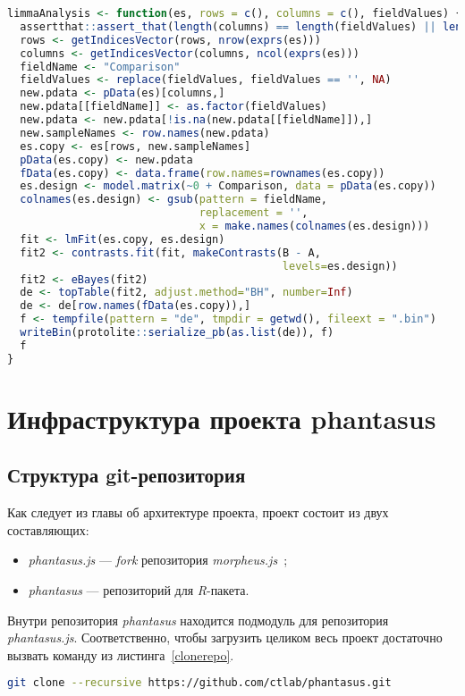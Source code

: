 \begin{lstlisting}[float=!h,caption={Реализация анализа дифференциальной экспрессии в R-пакете phantasus},label={limmaAnalysis},language=R]
limmaAnalysis <- function(es, rows = c(), columns = c(), fieldValues) {
  assertthat::assert_that(length(columns) == length(fieldValues) || length(columns) == 0)
  rows <- getIndicesVector(rows, nrow(exprs(es)))
  columns <- getIndicesVector(columns, ncol(exprs(es)))
  fieldName <- "Comparison"
  fieldValues <- replace(fieldValues, fieldValues == '', NA)
  new.pdata <- pData(es)[columns,]
  new.pdata[[fieldName]] <- as.factor(fieldValues)
  new.pdata <- new.pdata[!is.na(new.pdata[[fieldName]]),]
  new.sampleNames <- row.names(new.pdata)
  es.copy <- es[rows, new.sampleNames]
  pData(es.copy) <- new.pdata
  fData(es.copy) <- data.frame(row.names=rownames(es.copy))
  es.design <- model.matrix(~0 + Comparison, data = pData(es.copy))
  colnames(es.design) <- gsub(pattern = fieldName,
                              replacement = '',
                              x = make.names(colnames(es.design)))
  fit <- lmFit(es.copy, es.design)
  fit2 <- contrasts.fit(fit, makeContrasts(B - A,
                                           levels=es.design))
  fit2 <- eBayes(fit2)
  de <- topTable(fit2, adjust.method="BH", number=Inf)
  de <- de[row.names(fData(es.copy)),]
  f <- tempfile(pattern = "de", tmpdir = getwd(), fileext = ".bin")
  writeBin(protolite::serialize_pb(as.list(de)), f)
  f
}
\end{lstlisting}

\section{Инфраструктура проекта phantasus}
\subsection{Структура git-репозитория}
Как следует из главы об архитектуре проекта, проект состоит из двух составляющих:
\begin{itemize}
\item \emph{phantasus.js} --- \emph{fork} репозитория \emph{morpheus.js}~\cite{morpheus};
\item \emph{phantasus} --- репозиторий для \emph{R}-пакета.
\end{itemize}
Внутри репозитория \emph{phantasus} находится подмодуль для репозитория \emph{phantasus.js}.
Соответственно, чтобы загрузить целиком весь проект достаточно вызвать команду из листинга~\ref{clonerepo}.
\begin{lstlisting}[float=!h,language=bash,label={clonerepo},caption={Клонирование репозитория проекта phantasus}]
  git clone --recursive https://github.com/ctlab/phantasus.git
\end{lstlisting}

